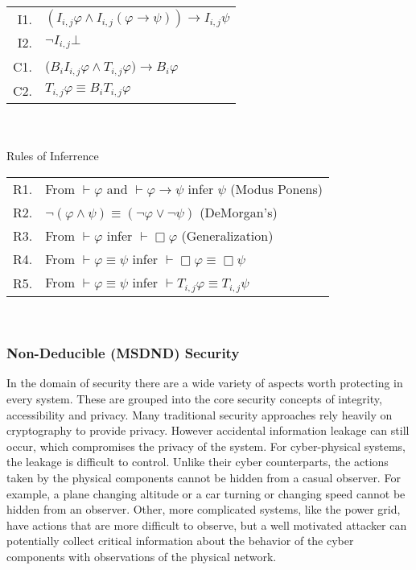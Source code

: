 \begin{table}[!t]
\begin{tabular}{r l}
I1. & $(I_{i,j} \varphi \wedge I_{i,j} (\varphi \rightarrow \psi )) \rightarrow I_{i,j} \psi$\\
I2. & $\neg I_{i,j} \bot$ \\
C1. & ($B_i I_{i,j} \varphi \wedge T_{i,j} \varphi) \rightarrow B_i \varphi$ \\
C2. & $T_{i,j} \varphi \equiv B_i T_{i,j} \varphi$ \\
\end{tabular} \\~\\
Rules of Inferrence \\
\begin{tabular}{r l}
R1. & From $\vdash \varphi$ and $\vdash \varphi \rightarrow \psi$ infer $\psi$ (Modus Ponens) \\
R2. & $\neg (\varphi \wedge \psi) \equiv (\neg \varphi \vee \neg \psi)$ (DeMorgan's)\\
R3. & From $\vdash \varphi$ infer $\vdash \Box \varphi$ (Generalization)\\
R4. & From $\vdash \varphi \equiv \psi$ infer $\vdash \Box \varphi \equiv \Box \psi$\\
R5. & From $\vdash \varphi \equiv \psi$ infer $\vdash T_{i,j} \varphi \equiv T_{i,j} \psi$\\
\end{tabular} \\
\label{tab:axiomatic}
\end{table}

\subsubsection{Non-Deducible (MSDND) Security}

In the domain of security there are a wide variety of aspects worth protecting in every system. These are grouped into the core security concepts of integrity, accessibility and privacy. Many traditional security approaches rely heavily on cryptography to provide privacy. However accidental information leakage can still occur, which compromises the privacy of the system. For cyber-physical systems, the leakage is difficult to control. Unlike their cyber counterparts, the actions taken by the physical components cannot be hidden from a casual observer. For example, a plane changing altitude or a car turning or changing speed cannot be hidden from an observer. Other, more complicated systems, like the power grid, have actions that are more difficult to observe, but a well motivated attacker can potentially collect critical information about the behavior of the cyber components with observations of the physical network\cite{Roth2012}.

